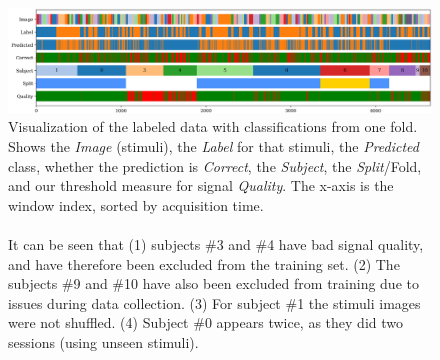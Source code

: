         \begin{landscape}
            \begin{figure}
                \centering
                \includegraphics[width=24cm]{img/timebars.png}
                \caption{Visualization of the labeled data with classifications from one fold. Shows the \emph{Image} (stimuli), the \emph{Label} for that stimuli, the \emph{Predicted} class, whether the prediction is \emph{Correct}, the \emph{Subject}, the \emph{Split}/Fold, and our threshold measure for signal \emph{Quality}. The x-axis is the window index, sorted by acquisition time.
                \\
                \\
                It can be seen that (1) subjects \#3 and \#4 have bad signal quality, and have therefore been excluded from the training set. (2) The subjects \#9 and \#10 have also been excluded from training due to issues during data collection. (3) For subject \#1 the stimuli images were not shuffled. (4) Subject \#0 appears twice, as they did two sessions (using unseen stimuli).}\label{fig:timebars}
            \end{figure}
        \end{landscape}

